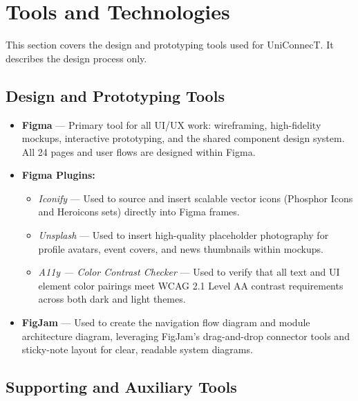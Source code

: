 \documentclass[12pt, a4paper]{article}
\begin{document}
\section{Tools and Technologies}

This section covers the design and prototyping tools used for UniConnecT. It describes
the design process only.

\subsection{Design and Prototyping Tools}

\begin{itemize}
    \item \textbf{Figma} --- Primary tool for all UI/UX work: wireframing,
    high-fidelity mockups, interactive prototyping, and the shared component design
    system. All 24 pages and user flows are designed within Figma.

    \item \textbf{Figma Plugins:}
        \begin{itemize}
            \item \textit{Iconify} --- Used to source and insert scalable vector icons
            (Phosphor Icons and Heroicons sets) directly into Figma frames.
            \item \textit{Unsplash} --- Used to insert high-quality placeholder
            photography for profile avatars, event covers, and news thumbnails
            within mockups.
            \item \textit{A11y --- Color Contrast Checker} --- Used to verify that
            all text and UI element color pairings meet WCAG 2.1 Level AA contrast
            requirements across both dark and light themes.
        \end{itemize}

    \item \textbf{FigJam} --- Used to create the navigation flow diagram and module
    architecture diagram, leveraging FigJam's drag-and-drop connector tools and
    sticky-note layout for clear, readable system diagrams.
\end{itemize}

\subsection{Supporting and Auxiliary Tools}
\end{document}
